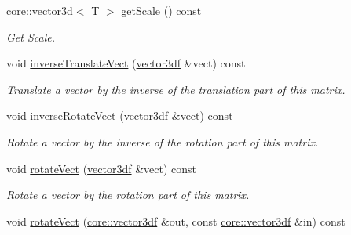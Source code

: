 \begin{DoxyCompactItemize}
\hyperlink{classirr_1_1core_1_1vector3d}{core\+::vector3d}$<$ T $>$ \hyperlink{classirr_1_1core_1_1CMatrix4_a27801e0cb2d3ce458f66ff7cfbe13544}{get\+Scale} () const
\begin{DoxyCompactList}\small\item\em Get Scale. \end{DoxyCompactList}\item 
\mbox{\label{classirr_1_1core_1_1CMatrix4_a7850ba9e85bff2b7d8e3bce517e0aba0}} 
void \hyperlink{classirr_1_1core_1_1CMatrix4_a7850ba9e85bff2b7d8e3bce517e0aba0}{inverse\+Translate\+Vect} (\hyperlink{namespaceirr_1_1core_ae6e2b2a6c552833ebbd5b7463d03586b}{vector3df} \&vect) const
\begin{DoxyCompactList}\small\item\em Translate a vector by the inverse of the translation part of this matrix. \end{DoxyCompactList}\item 
\mbox{\label{classirr_1_1core_1_1CMatrix4_aed5bc8bb8e9b58549034e2f48189d35e}} 
void \hyperlink{classirr_1_1core_1_1CMatrix4_aed5bc8bb8e9b58549034e2f48189d35e}{inverse\+Rotate\+Vect} (\hyperlink{namespaceirr_1_1core_ae6e2b2a6c552833ebbd5b7463d03586b}{vector3df} \&vect) const
\begin{DoxyCompactList}\small\item\em Rotate a vector by the inverse of the rotation part of this matrix. \end{DoxyCompactList}\item 
\mbox{\label{classirr_1_1core_1_1CMatrix4_a45e023efd5e6d0e328c63705bfb5bd06}} 
void \hyperlink{classirr_1_1core_1_1CMatrix4_a45e023efd5e6d0e328c63705bfb5bd06}{rotate\+Vect} (\hyperlink{namespaceirr_1_1core_ae6e2b2a6c552833ebbd5b7463d03586b}{vector3df} \&vect) const
\begin{DoxyCompactList}\small\item\em Rotate a vector by the rotation part of this matrix. \end{DoxyCompactList}\item 
\mbox{\label{classirr_1_1core_1_1CMatrix4_aa421db751017ae447e20ac946bb4ad92}} 
void \hyperlink{classirr_1_1core_1_1CMatrix4_aa421db751017ae447e20ac946bb4ad92}{rotate\+Vect} (\hyperlink{namespaceirr_1_1core_ae6e2b2a6c552833ebbd5b7463d03586b}{core\+::vector3df} \&out, const \hyperlink{namespaceirr_1_1core_ae6e2b2a6c552833ebbd5b7463d03586b}{core\+::vector3df} \&in) const

\end{DoxyCompactItemize}
